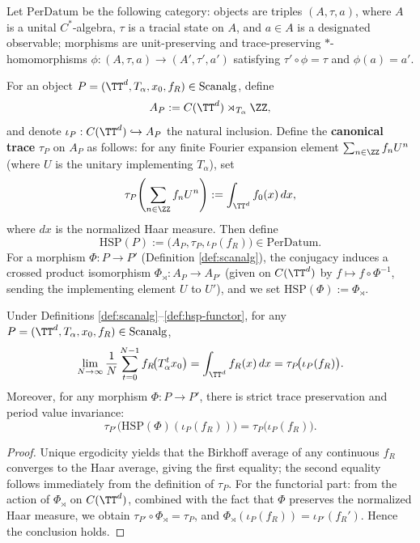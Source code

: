 \begin{definition}\label{def:perdatum}
Let \(\mathrm{PerDatum}\) be the following category: objects are triples \((A,\tau,a)\), where \(A\) is a unital \(C^\ast\)-algebra, \(\tau\) is a tracial state on \(A\), and \(a\in A\) is a designated observable; morphisms are unit-preserving and trace-preserving \(\ast\)-homomorphisms \(\phi:(A,\tau,a)\to(A',\tau',a')\) satisfying \(\tau' \circ \phi=\tau\) and \(\phi(a)=a'\).
\end{definition}

\begin{definition}\label{def:hsp-functor}
For an object \(P=(\TT^d,T_\alpha,x_0,f_R)\in\mathrm{Scanalg}\), define
\[
A_P:=C(\TT^d)\rtimes_{T_\alpha}\ZZ,
\]
and denote \(\iota_P:C(\TT^d)\hookrightarrow A_P\) the natural inclusion.
Define the \textbf{canonical trace} \(\tau_P\) on \(A_P\) as follows: for any finite Fourier expansion element
\(
\sum_{n\in\ZZ} f_n U^n
\) (where \(U\) is the unitary implementing \(T_\alpha\)), set
\[
\tau_P\!\left(\sum_{n\in\ZZ} f_n U^n\right):=\int_{\TT^d} f_0(x)\,dx,
\]
where \(dx\) is the normalized Haar measure. Then define
\[
\mathrm{HSP}(P):=\bigl(A_P,\tau_P,\iota_P(f_R)\bigr)\in\mathrm{PerDatum}.
\]
For a morphism \(\Phi:P\to P'\) (Definition \ref{def:scanalg}), the conjugacy induces a crossed product isomorphism \(\Phi_\rtimes:A_P\to A_{P'}\) (given on \(C(\TT^d)\) by \(f\mapsto f\circ\Phi^{-1}\), sending the implementing element \(U\) to \(U'\)), and we set \(\mathrm{HSP}(\Phi):=\Phi_\rtimes\).
\end{definition}

\begin{theorem}[``Period value \(=\) trace value'': noncommutative formulation of uniquely ergodic Birkhoff average]\label{thm:hsp-period-trace}
Under Definitions \ref{def:scanalg}--\ref{def:hsp-functor}, for any \(P=(\TT^d,T_\alpha,x_0,f_R)\in\mathrm{Scanalg}\),
\[
\lim_{N\to\infty}\frac{1}{N}\sum_{t=0}^{N-1} f_R\!\bigl(T_\alpha^t x_0\bigr)
=\int_{\TT^d} f_R(x)\,dx
=\tau_P\!\bigl(\iota_P(f_R)\bigr).
\]
Moreover, for any morphism \(\Phi:P\to P'\), there is strict trace preservation and period value invariance:
\[
\tau_{P'}\!\bigl(\mathrm{HSP}(\Phi)(\iota_P(f_R))\bigr)=\tau_P\!\bigl(\iota_P(f_R)\bigr).
\]
\end{theorem}

\begin{proof}
Unique ergodicity yields that the Birkhoff average of any continuous \(f_R\) converges to the Haar average, giving the first equality; the second equality follows immediately from the definition of \(\tau_P\).
For the functorial part: from the action of \(\Phi_\rtimes\) on \(C(\TT^d)\), combined with the fact that \(\Phi\) preserves the normalized Haar measure, we obtain \(\tau_{P'}\circ \Phi_\rtimes=\tau_P\), and \(\Phi_\rtimes(\iota_P(f_R))=\iota_{P'}(f_R')\). Hence the conclusion holds.
\end{proof}

